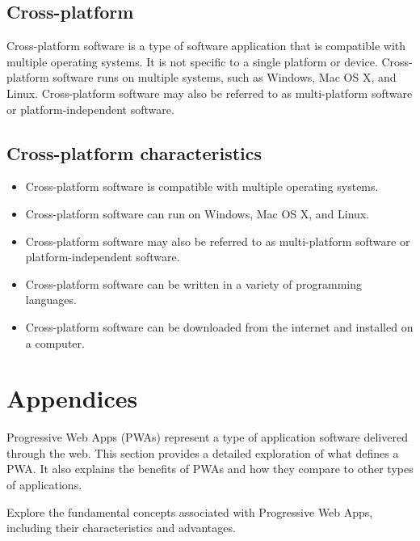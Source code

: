\documentclass[12pt,a4paper, twosite]{article}
\begin{document}
\subsection{Cross-platform}
\label{sec:orgb8b6b9d}
Cross-platform software is a type of software application that is compatible with multiple operating systems. It is not specific to a single platform or device. Cross-platform software runs on multiple systems, such as Windows, Mac OS X, and Linux. Cross-platform software may also be referred to as multi-platform software or platform-independent software.

\subsection*{Cross-platform characteristics}
\begin{itemize}
  \item Cross-platform software is compatible with multiple operating systems.
  \item Cross-platform software can run on Windows, Mac OS X, and Linux.
  \item Cross-platform software may also be referred to as multi-platform software or platform-independent software.
  \item Cross-platform software can be written in a variety of programming languages.
\item Cross-platform software can be downloaded from the internet and installed on a computer.
\end{itemize}




\newpage


\section{Appendices}
\label{sec:org75cea03}


Progressive Web Apps (PWAs) represent a type of application software delivered through the web. This section provides a detailed exploration of what defines a PWA. It also explains the benefits of PWAs and how they compare to other types of applications.

Explore the fundamental concepts associated with Progressive Web Apps, including their characteristics and advantages.
\end{document}
